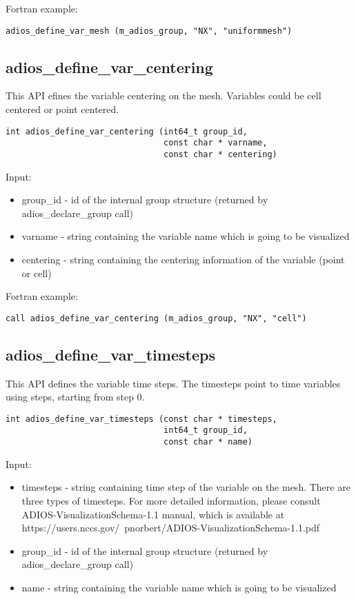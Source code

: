 Fortran example:
\begin{lstlisting}[alsolanguage=Fortran,caption={},label={}]
adios_define_var_mesh (m_adios_group, "NX", "uniformmesh")
\end{lstlisting}


\subsection{adios\_define\_var\_centering}
This API efines the variable centering on the mesh. Variables could be cell centered or point centered.

\begin{lstlisting}[alsolanguage=C,caption={},label={}]
int adios_define_var_centering (int64_t group_id, 
                                const char * varname, 
                                const char * centering)
\end{lstlisting}

Input:
\begin{itemize}
\item group\_id - id of the internal group structure (returned by adios\_declare\_group call)
\item varname - string containing the variable name which is going to be visualized
\item centering - string containing the centering information of the variable (point or cell)
\end{itemize}

Fortran example:
\begin{lstlisting}[alsolanguage=Fortran,caption={},label={}]
call adios_define_var_centering (m_adios_group, "NX", "cell")
\end{lstlisting}


\subsection{adios\_define\_var\_timesteps}
This API defines the variable time steps. The timesteps point to time variables using steps, 
starting from step 0.


\begin{lstlisting}[alsolanguage=C,caption={},label={}]
int adios_define_var_timesteps (const char * timesteps, 
                                int64_t group_id, 
                                const char * name)
\end{lstlisting}

Input:
\begin{itemize}
\item timesteps - string containing time step of the variable on the mesh. There are three types of
timesteps. For more detailed information, please consult ADIOS-VisualizationSchema-1.1 manual,
which is available at https://users.nccs.gov/~pnorbert/ADIOS-VisualizationSchema-1.1.pdf
\item group\_id - id of the internal group structure (returned by adios\_declare\_group call)
\item name - string containing the variable name which is going to be visualized
\end{itemize}

